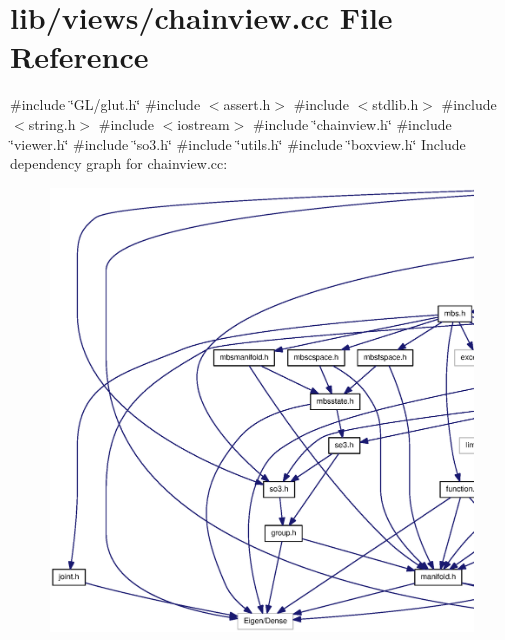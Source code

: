 \section{lib/views/chainview.cc \-File \-Reference}
\label{chainview_8cc}
{\ttfamily \#include \char`\"{}\-G\-L/glut.\-h\char`\"{}}\*
{\ttfamily \#include $<$assert.\-h$>$}\*
{\ttfamily \#include $<$stdlib.\-h$>$}\*
{\ttfamily \#include $<$string.\-h$>$}\*
{\ttfamily \#include $<$iostream$>$}\*
{\ttfamily \#include \char`\"{}chainview.\-h\char`\"{}}\*
{\ttfamily \#include \char`\"{}viewer.\-h\char`\"{}}\*
{\ttfamily \#include \char`\"{}so3.\-h\char`\"{}}\*
{\ttfamily \#include \char`\"{}utils.\-h\char`\"{}}\*
{\ttfamily \#include \char`\"{}boxview.\-h\char`\"{}}\*
\-Include dependency graph for chainview.\-cc\-:\nopagebreak
\begin{figure}[H]
\begin{center}
\leavevmode
\includegraphics[width=350pt]{chainview_8cc__incl}
\end{center}
\end{figure}
